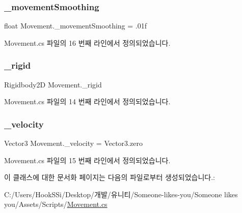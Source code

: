 \subsubsection{\texorpdfstring{\_movementSmoothing}{\_movementSmoothing}}
{\footnotesize\ttfamily float Movement.\+\_\+movement\+Smoothing = .\+01f}



Movement.\+cs 파일의 16 번째 라인에서 정의되었습니다.

\mbox{\label{class_movement_a8b24a93b5f529e53c668ff81bde13c0d}} 
\subsubsection{\texorpdfstring{\_rigid}{\_rigid}}
{\footnotesize\ttfamily Rigidbody2D Movement.\+\_\+rigid\hspace{0.3cm}{\ttfamily [protected]}}



Movement.\+cs 파일의 14 번째 라인에서 정의되었습니다.

\mbox{\label{class_movement_a6ea6768262f1dca968be8ee5c14a0cc1}} 
\subsubsection{\texorpdfstring{\_velocity}{\_velocity}}
{\footnotesize\ttfamily Vector3 Movement.\+\_\+velocity = Vector3.\+zero\hspace{0.3cm}{\ttfamily [protected]}}



Movement.\+cs 파일의 15 번째 라인에서 정의되었습니다.



이 클래스에 대한 문서화 페이지는 다음의 파일로부터 생성되었습니다.\+:\begin{DoxyCompactItemize}
\item 
C\+:/\+Users/\+Hook\+S\+Si/\+Desktop/개발/유니티/\+Someone-\/likes-\/you/\+Someone likes you/\+Assets/\+Scripts/\mbox{\hyperlink{_movement_8cs}{Movement.\+cs}}\end{DoxyCompactItemize}

